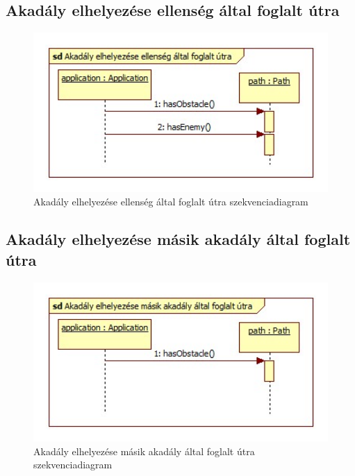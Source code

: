 \subsection{Akadály elhelyezése ellenség által foglalt útra}
\begin{figure}[H]
\begin{center}
\includegraphics[width=17cm]{chapters/chapter05/images/sd_Akadaly_elhelyezese_ellenseg_altal_foglalt_utra.jpg}
\caption{Akadály elhelyezése ellenség által foglalt útra szekvenciadiagram}
\label{fig:sd_Akadaly_elhelyezese_ellenseg_altal_foglalt_utra}
\end{center}
\end{figure}

\subsection{Akadály elhelyezése másik akadály által foglalt útra}
\begin{figure}[H]
\begin{center}
\includegraphics[width=17cm]{chapters/chapter05/images/sd_Akadaly_elhelyezese_masik_akadaly_altal_foglalt_utra.jpg}
\caption{Akadály elhelyezése másik akadály által foglalt útra szekvenciadiagram}
\label{fig:sd_Akadaly_elhelyezese_masik_akadaly_altal_foglalt_utra}
\end{center}
\end{figure}

